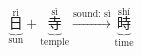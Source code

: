 \[ \underbrace{\overset{\text{rì}}{\text{日}}}_{\text{sun}} + \underbrace{\overset{\text{sì}}{\text{寺}}}_{\text{temple}} \xrightarrow{\text{sound: sì}} \underbrace{\overset{\text{shí}}{\text{時}}}_{\text{time}} \]

